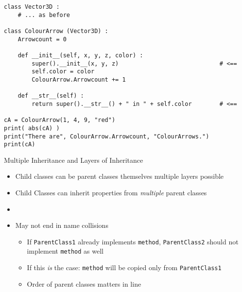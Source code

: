 \begin{frame}[fragile]
%
\begin{codebox}
\begin{verbatim}
class Vector3D :
    # ... as before

class ColourArrow (Vector3D) :
    Arrowcount = 0
    
    def __init__(self, x, y, z, color) :
        super().__init__(x, y, z)                             # <==
        self.color = color
        ColourArrow.Arrowcount += 1
    
    def __str__(self) :
        return super().__str__() + " in " + self.color        # <==

cA = ColourArrow(1, 4, 9, "red")
print( abs(cA) )
print("There are", ColourArrow.Arrowcount, "ColourArrows.")
print(cA)
\end{verbatim}
\end{codebox}
%
\end{frame}


\begin{frame}[fragile]{Multiple Inheritance and Layers of Inheritance}
%
\begin{itemize}
\item Child classes can be parent classes themselves \Thus multiple layers possible
\item Child Classes can inherit properties from \emph{multiple} parent classes
\item {}
\item May not end in name collisions
	\begin{itemize}
	\item[\Thus] If \texttt{ParentClass1} already implements \texttt{method}, \texttt{ParentClass2} should not implement \texttt{method} as well
	\item[\Thus] If this \emph{is} the case: \texttt{method} will be copied only from \texttt{ParentClass1}
	\item[\Thus] Order of parent classes matters in line 
	\end{itemize}
\end{itemize}
%
\end{frame}


